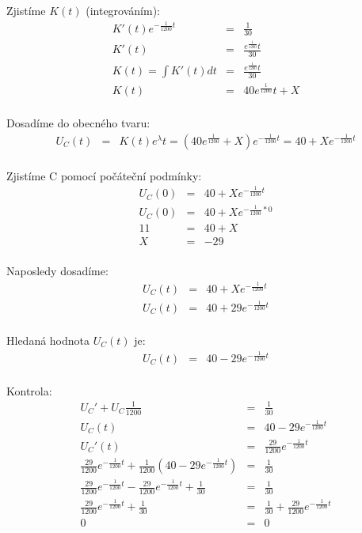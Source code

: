 Zjistíme $K(t)$ (integrováním):
    \begin{eqnarray*}
        K'(t)e^{-\frac{1}{1200}t} &= & \frac{1}{30}\\
        K'(t) &= & \frac{e^\frac{1}{1200}t}{30}\\
        K(t) = \int K'(t) dt &= & \frac{e^\frac{1}{1200}t}{30}\\
        K(t) &= & 40e^\frac{1}{1200}t + X\\
	\end{eqnarray*}

Dosadíme do obecného tvaru:
    \begin{eqnarray*}
        U_{C}(t) &= & K(t)e^\lambda t = (40e^\frac{1}{1200} + X)e^{-\frac{1}{1200}t} = 40 + Xe^{-\frac{1}{1200}t}\\
	\end{eqnarray*}

Zjistíme C pomocí počáteční podmínky:
    \begin{eqnarray*}
        U_{C}(0) &= & 40 + Xe^{-\frac{1}{1200}t}\\
        U_{C}(0) &= & 40 + Xe^{-\frac{1}{1200} * 0}\\
        11 &= & 40 + X\\
        X &= & - 29\\
	\end{eqnarray*}

Naposledy dosadíme:
    \begin{eqnarray*}
        U_{C}(t) &= &  40 + Xe^{-\frac{1}{1200}t}\\
        U_{C}(t) &= &  40 + 29e^{-\frac{1}{1200}t}\\
	\end{eqnarray*}

Hledaná hodnota $U_{C}(t)$ je:
    \begin{eqnarray*}
        U_{C}(t) &= & 40 - 29e^{-\frac{1}{1200}t}\\
	\end{eqnarray*}
	
Kontrola:
    \begin{eqnarray*}
        U_{C}' + U_{C}\frac{1}{1200} &= & \frac{1}{30}\\
        U_{C}(t) &= & 40 - 29e^{-\frac{1}{1200}t}\\
        U_{C}'(t) &= & \frac{29}{1200}e^{-\frac{1}{1200}t}\\
        \frac{29}{1200}e^{-\frac{1}{1200}t} + \frac{1}{1200}(40 - 29e^{-\frac{1}{1200}t}) &= & \frac{1}{30}\\
        \frac{29}{1200}e^{-\frac{1}{1200}t} - \frac{29}{1200}e^{-\frac{1}{1200}t} + \frac{1}{30} &= & \frac{1}{30}\\
        \frac{29}{1200}e^{-\frac{1}{1200}t} + \frac{1}{30} &= & \frac{1}{30} + \frac{29}{1200}e^{-\frac{1}{1200}t}\\
        0 &= & 0\\
	\end{eqnarray*}